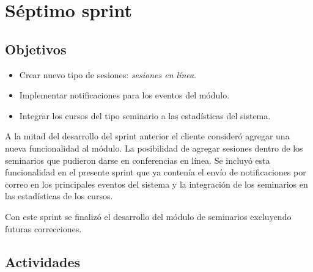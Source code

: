 \section{Séptimo sprint} %
\label{sec:septimo_sprint}

\subsection{Objetivos}

\begin{itemize}
	\item Crear nuevo tipo de sesiones: \emph{sesiones en línea}.
	\item Implementar notificaciones para los eventos del módulo.
	\item Integrar los cursos del tipo seminario a las estadísticas del sistema.
\end{itemize}

A la mitad del desarrollo del sprint anterior el cliente consideró agregar una nueva funcionalidad al módulo. La posibilidad de agregar sesiones dentro de los seminarios que pudieron darse en conferencias en línea. Se incluyó esta funcionalidad en el presente sprint que ya contenía el envío de notificaciones por correo en los principales eventos del sistema y la integración de los seminarios en las estadísticas de los cursos.

Con este sprint se finalizó el desarrollo del módulo de seminarios excluyendo futuras correcciones.

\subsection{Actividades} %
\label{sub:actividades7}

